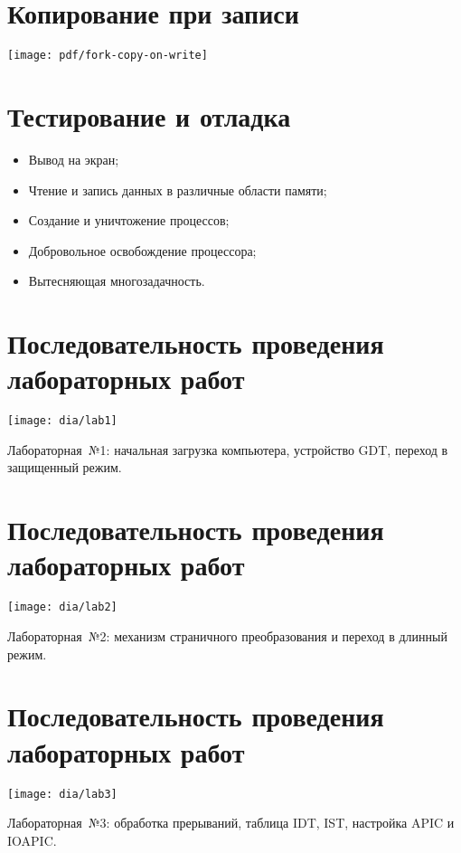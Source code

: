 \documentclass[12pt]{article}
\begin{document}
\section{\textbf{Копирование при записи}}
\texttt{[image: pdf/fork-copy-on-write]}


\section{\textbf{Тестирование и отладка}}
\begin{itemize}
\item Вывод на экран;
\item Чтение и запись данных в различные области памяти;
\item Создание и уничтожение процессов;
\item Добровольное освобождение процессора;
\item Вытесняющая многозадачность.
\end{itemize}


\section{\textbf{Последовательность проведения лабораторных работ}}
\begin{center}
\texttt{[image: dia/lab1]}
\end{center}

Лабораторная~№1: начальная загрузка компьютера, устройство GDT, переход в защищенный режим.


\section{\textbf{Последовательность проведения лабораторных работ}}
\begin{center}
\texttt{[image: dia/lab2]}
\end{center}

Лабораторная~№2: механизм страничного преобразования и переход в длинный режим.

\section{\textbf{Последовательность проведения лабораторных работ}}
\begin{center}
\texttt{[image: dia/lab3]}
\end{center}

Лабораторная~№3: обработка прерываний, таблица IDT, IST, настройка APIC и IOAPIC.
\end{document}
